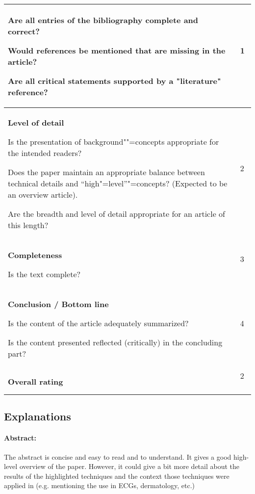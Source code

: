 \documentclass[12pt]{scrartcl}
\begin{document}
\begin{longtable}{|p{12cm}|p{2.5cm}|}
				Are all entries of the bibliography complete and correct?
				
				Would references be mentioned that are missing in the article?
				
				Are all critical statements supported by a "literature" reference?
			& 1 \ \\				
		\hline
			\textbf{Level of detail}
			
				Is the presentation of background""=concepts appropriate for the intended readers?
				
				Does the paper maintain an appropriate balance between technical details and "`high"=level"'"=concepts? (Expected to be an overview article).
				
				Are the breadth and level of detail appropriate for an article of this length?
			& 2 \ \\				
		\hline
			\textbf{Completeness}
			
				Is the text complete?			
			& 3 \ \\	
		\hline
			\textbf{Conclusion / Bottom line}%
			
				  Is the content of the article adequately summarized?
				
				Is the content presented reflected (critically) in the concluding part?			
			& 4 \ \\				
		\hline
			\textbf{Overall rating}%
			& 2 \ \\				
		\hline		
		
\end{longtable}


\subsection*{Explanations}




\paragraph{Abstract:} The abstract is concise and easy to read and to
understand. It gives a good high-level overview of the paper. However,
it could give a bit more detail about the results of the highlighted
techniques and the context those techniques were applied in (e.g. mentioning
the use in ECGs, dermatology, etc.)
\end{document}
